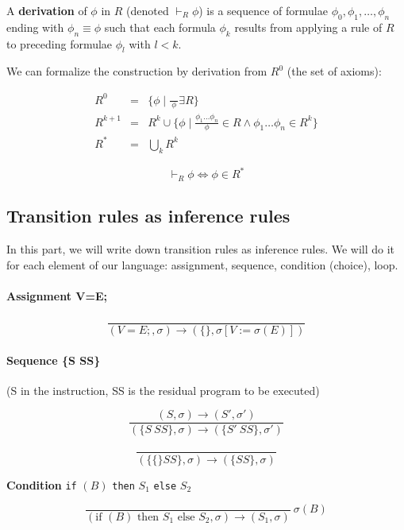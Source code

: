 \documentclass[12pt, a4paper]{book}
\begin{document}
A \textbf{derivation} of $\phi$ in $R$ (denoted $\vdash_R \phi$) is a sequence
of formulae $\phi_0,\phi_1,\ldots,\phi_n$ ending with $\phi_n \equiv \phi$ such
that each formula $\phi_k$ results from applying a rule of $R$ to preceding
formulae $\phi_l$ with $l<k$. \newline

We can formalize the construction by derivation from $R^0$ (the set of axioms):

\begin{eqnarray}
R^{0}   & = & \{\phi \mid \frac{}{\ \phi \ } \exists R\} \\
R^{k+1} & = & R^{k} \cup \{ \phi \mid \frac{\phi_{1} \ldots \phi_{n}}{\phi}
\in R \land \phi_{1}\ldots\phi_{n} \in R^{k} \} \\
R^{*}   & = & \bigcup_{k} R^{k}
\end{eqnarray}

$$
\vdash_{R} \phi \iff \phi \in R^{*}
$$

\subsection{Transition rules as inference rules}
\label{sub:Transition rules as inference rules}

In this part, we will write down transition rules as inference rules. We will
do it for each element of our language: assignment, sequence, condition
(choice), loop.

\paragraph{Assignment V=E;}

$$
\frac{}
{(V=E;,\sigma) \longrightarrow (\{ \}, \sigma [V := \sigma (E)] )}
$$

\paragraph{Sequence \{S SS\}} (S in the instruction, SS is the residual program
to be executed)

$$
\frac{(S,\sigma) \longrightarrow (S',\sigma')}
{(\{ S\ SS \} , \sigma ) \longrightarrow (\{S'\ SS\}, \sigma')}
$$

$$
\frac{}
{(\{ \{ \} SS\}, \sigma) \longrightarrow (\{ SS \}, \sigma)}
$$

\noindent \textbf{Condition} \verb#if# $(B)$ \verb#then# $S_{1}$ \verb#else# $S_{2}$

$$
\frac{}
{(\textrm{if } (B) \textrm{ then } S_{1} \textrm{ else } S_{2}, \sigma) \longrightarrow (S_{1}, \sigma)}
\ \sigma(B)
$$
\end{document}
